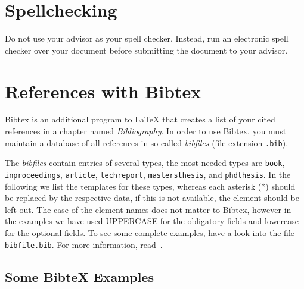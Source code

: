 \cite[p.\,175]{elmenreich:2005}

\section{Spellchecking}

Do not use your advisor as your spell checker. Instead, run an
electronic spell checker over your document before submitting the
document to your advisor.

\section{References with Bibtex}

Bibtex is an additional program to {\LaTeX} that creates a list of
your cited references in a chapter named {\em Bibliography}. In
order to use Bibtex, you must maintain a database of all references
in so-called \emph{bibfiles} (file extension \texttt{.bib}).

The \emph{bibfiles} contain entries of several types, the most
needed types are \texttt{book}, \texttt{inproceedings},
\texttt{article}, \texttt{techreport}, \texttt{mastersthesis}, and
\texttt{phdthesis}. In the following we list the templates for these
types, whereas each asterisk (*) should be replaced by the
respective data, if this is not available, the element should be
left out. The case of the element names does not matter to Bibtex,
however in the examples we have used UPPERCASE for the obligatory
fields and lowercase for the optional fields. To see some complete
examples, have a look into the file \texttt{bibfile.bib}. For more
information, read~\cite{patashnik:1988}.

\subsection{Some BibteX Examples}

